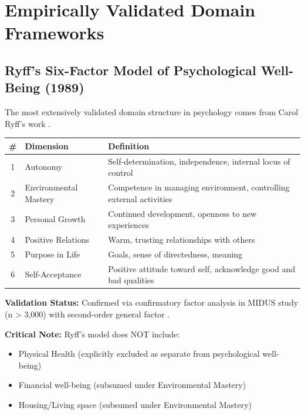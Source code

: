 
\section{Empirically Validated Domain Frameworks}
\label{sec:bj-validated}

\subsection{Ryff's Six-Factor Model of Psychological Well-Being (1989)}

The most extensively validated domain structure in psychology comes from Carol Ryff's work \citep{ryff1989happiness, ryff1995structure}.

\begin{center}
\begin{tabular}{@{}clp{6cm}@{}}
\toprule
\textbf{\#} & \textbf{Dimension} & \textbf{Definition} \\
\midrule
1 & Autonomy & Self-determination, independence, internal locus of control \\
2 & Environmental Mastery & Competence in managing environment, controlling external activities \\
3 & Personal Growth & Continued development, openness to new experiences \\
4 & Positive Relations & Warm, trusting relationships with others \\
5 & Purpose in Life & Goals, sense of directedness, meaning \\
6 & Self-Acceptance & Positive attitude toward self, acknowledge good and bad qualities \\
\bottomrule
\end{tabular}
\end{center}

\textbf{Validation Status:} Confirmed via confirmatory factor analysis in MIDUS study (n > 3,000) with second-order general factor \citep{ryff1995structure}.

\textbf{Critical Note:} Ryff's model does NOT include:
\begin{itemize}[nosep]
\item Physical Health (explicitly excluded as separate from psychological well-being)
\item Financial well-being (subsumed under Environmental Mastery)
\item Housing/Living space (subsumed under Environmental Mastery)
\end{itemize}

